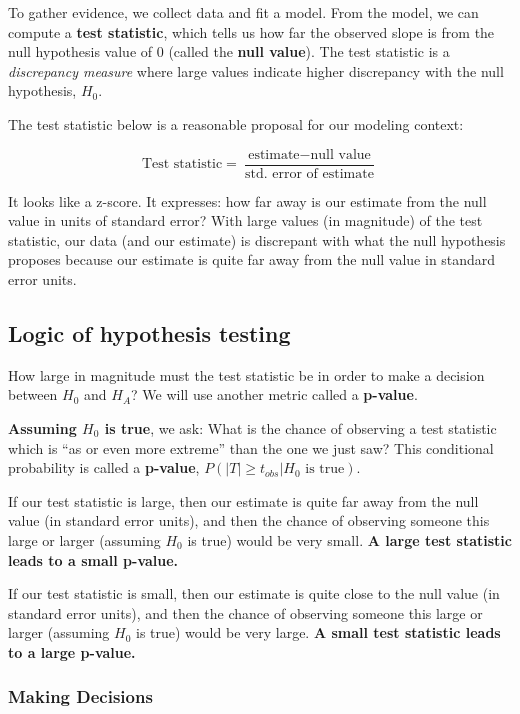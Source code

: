 \documentclass[]{book}
\begin{document}
To gather evidence, we collect data and fit a model. From the model, we can compute a \textbf{test statistic}, which tells us how far the observed slope is from the null hypothesis value of 0 (called the \textbf{null value}). The test statistic is a \emph{discrepancy measure} where large values indicate higher discrepancy with the null hypothesis, \(H_0\).

The test statistic below is a reasonable proposal for our modeling context:

\[\text{Test statistic} = \frac{\text{estimate} - \text{null value}}{\text{std. error of estimate}}\]

It looks like a z-score. It expresses: how far away is our estimate from the null value in units of standard error? With large values (in magnitude) of the test statistic, our data (and our estimate) is discrepant with what the null hypothesis proposes because our estimate is quite far away from the null value in standard error units.

\hypertarget{logic-of-hypothesis-testing}{%
\subsection{Logic of hypothesis testing}\label{logic-of-hypothesis-testing}}

How large in magnitude must the test statistic be in order to make a decision between \(H_0\) and \(H_A\)? We will use another metric called a \textbf{p-value}.

\textbf{Assuming \(H_0\) is true}, we ask: What is the chance of observing a test statistic which is ``as or even more extreme'' than the one we just saw? This conditional probability is called a \textbf{p-value}, \(P(|T| \geq t_{obs} | H_0\text{ is true})\).

If our test statistic is large, then our estimate is quite far away from the null value (in standard error units), and then the chance of observing someone this large or larger (assuming \(H_0\) is true) would be very small. \textbf{A large test statistic leads to a small p-value.}

If our test statistic is small, then our estimate is quite close to the null value (in standard error units), and then the chance of observing someone this large or larger (assuming \(H_0\) is true) would be very large. \textbf{A small test statistic leads to a large p-value.}

\hypertarget{making-decisions}{%
\subsubsection{Making Decisions}\label{making-decisions}}
\end{document}
